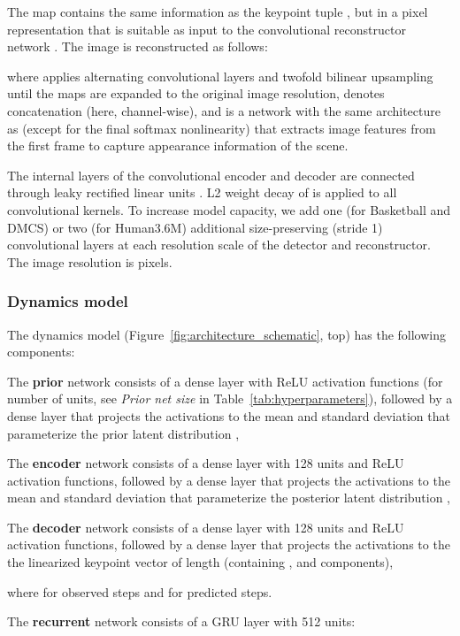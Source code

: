 The map  contains the same information as the keypoint tuple , but in a pixel representation that is suitable as input to the convolutional reconstructor network . The image is reconstructed as follows:

where  applies alternating convolutional layers and twofold bilinear upsampling until the  maps are expanded to the original image resolution,  denotes concatenation (here, channel-wise), and  is a network with the same architecture as  (except for the final softmax nonlinearity) that extracts image features from the first frame  to capture appearance information of the scene. 

The internal layers of the convolutional encoder and decoder are connected through leaky rectified linear units . L2 weight decay of  is applied to all convolutional kernels. To increase model capacity, we add one (for Basketball and DMCS) or two (for Human3.6M) additional size-preserving (stride 1) convolutional layers at each resolution scale of the detector and reconstructor. The image resolution is  pixels.

\subsubsection{Dynamics model}

The dynamics model (Figure~\ref{fig:architecture_schematic}, top) has the following components:

The \textbf{prior} network consists of a dense layer with ReLU activation functions (for number of units, see \emph{Prior net size} in Table~\ref{tab:hyperparameters}), followed by a dense layer that projects the activations to the mean and standard deviation that parameterize the prior latent distribution ,

The \textbf{encoder} network consists of a dense layer with 128 units and ReLU activation functions, followed by a dense layer that projects the activations to the mean and standard deviation that parameterize the posterior latent distribution ,

The \textbf{decoder} network consists of a dense layer with 128 units and ReLU activation functions, followed by a dense layer that projects the activations to the the linearized keypoint vector  of length  (containing ,  and  components),

where  for observed steps and  for predicted steps.

The \textbf{recurrent} network consists of a GRU layer with 512 units:

